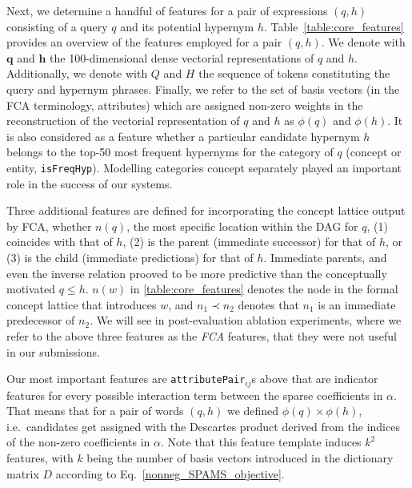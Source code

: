 \documentclass[11pt,a4paper]{article}
\begin{document}
Next, we determine a handful of features for a pair of expressions $(q, h)$
consisting of a query $q$ and its potential hypernym $h$.
Table~\ref{table:core_features} provides an overview of the features
employed for a pair $(q, h)$.
We denote with $\mathbf{q}$ and $\mathbf{h}$ the 100-dimensional dense
vectorial representations of $q$ and $h$.
Additionally, we denote with $Q$ and $H$ the sequence of tokens constituting
the query and hypernym phrases.
Finally, we refer to the set of basis vectors (in the FCA terminology,
attributes) which are assigned non-zero weights in the reconstruction of the
vectorial representation of $q$ and $h$ as $\phi(q)$ and $\phi(h)$.  
It is also considered as a feature whether a
particular candidate hypernym $h$ belongs to the top-50 most frequent hypernyms
for the category of $q$ (concept or entity, \texttt{isFreqHyp}).
Modelling categories concept separately played an important role in the success
of our systems.

Three additional features are defined for incorporating the concept lattice
output by FCA, whether $n(q)$, the most specific location within the DAG for
$q$,
(1) coincides with that of $h$,
(2) is the parent (immediate successor) for that of $h$, or
(3) is the child (immediate predictions) for that of $h$.
Immediate parents, and even the inverse relation prooved to be more predictive
than the conceptually motivated  $q\le h$.
$n(w)$ in \autoref{table:core_features} denotes the node in the formal concept
lattice that introduces $w$, and $n_1\prec n_2$ denotes that $n_1$ is an
immediate predecessor of $n_2$.
We will see in post-evaluation ablation experiments, where we refer to the
above three features as the \emph{FCA} features, that they were not useful in
our submissions.



Our most important features are \texttt{attributePair}$_{ij}$s above that are
indicator features for every possible interaction term 
between the sparse coefficients in $\alpha$. That means that for a pair of
words $(q, h)$ we defined $\phi(q) \times \phi(h)$, i.e.~candidates
get assigned with the Descartes product derived from the indices of the non-zero
coefficients in $\alpha$. Note that this feature template induces $k^2$
features, with $k$ being the number of basis vectors introduced in the dictionary matrix $D$ according to Eq.~\ref{nonneg_SPAMS_objective}.
\end{document}
